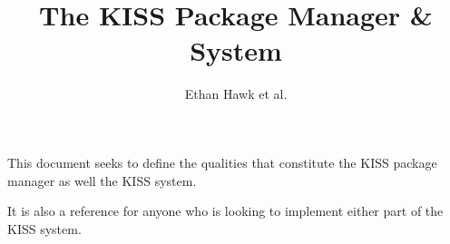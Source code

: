 \documentclass{article}
\title{The KISS Package Manager \& System}
\author{Ethan Hawk et al.}
\begin{document}
\maketitle

\newpage
This document seeks to define the qualities that constitute the
KISS package manager as well the KISS system.

It is also a reference for anyone who is looking to implement
either part of the KISS system.


\end{document}
